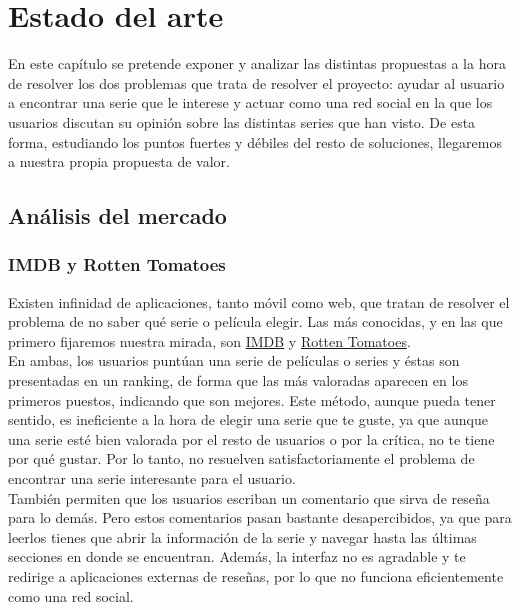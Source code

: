 \chapter{Estado del arte}
En este capítulo se pretende exponer y analizar las distintas propuestas a la hora de resolver los dos problemas que
trata de resolver el proyecto: ayudar al usuario a encontrar una serie que le interese y actuar como una red social en
la que los usuarios discutan su opinión sobre las distintas series que han visto. De esta forma, estudiando los puntos
fuertes y débiles del resto de soluciones, llegaremos a nuestra propia propuesta de valor.\\

\section{Análisis del mercado}
\subsection{IMDB y Rotten Tomatoes}
Existen infinidad de aplicaciones, tanto móvil como web, que tratan de resolver el problema de no saber qué serie o
película elegir. Las más conocidas, y en las que primero fijaremos nuestra mirada, son \href{https://www.imdb.com}
{IMDB} y \href{https://www.rottentomatoes.com}{Rotten Tomatoes}.\\

En ambas, los usuarios puntúan una serie de películas o series y éstas son presentadas en un ranking, de forma que
las más valoradas aparecen en los primeros puestos, indicando que son mejores. Este método, aunque pueda tener
sentido, es ineficiente a la hora de elegir una serie que te guste, ya que aunque una serie esté bien valorada por
el resto de usuarios o por la crítica, no te tiene por qué gustar. Por lo tanto, no resuelven satisfactoriamente
el problema de encontrar una serie interesante para el usuario.\\

También permiten que los usuarios escriban un comentario que sirva de reseña para lo demás. Pero estos comentarios
pasan bastante desapercibidos, ya que para leerlos tienes que abrir la información de la serie y navegar hasta las
últimas secciones en donde se encuentran. Además, la interfaz no es agradable y te redirige a aplicaciones externas de
reseñas, por lo que no funciona eficientemente como una red social.

